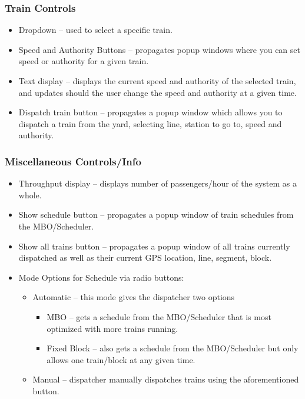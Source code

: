 	\subsubsection{Train Controls}
		\begin{itemize}
			\item Dropdown – used to select a specific train.
			\item Speed and Authority Buttons – propagates popup windows where you can set speed or authority for a given train.
			\item Text display – displays the current speed and authority of the selected train, and updates should the user change the speed and authority at a given time.
			\item Dispatch train button – propagates a popup window which allows you to dispatch a train from the yard, selecting line, station to go to, speed and authority.
		\end{itemize}

	\subsubsection{Miscellaneous Controls/Info}
		\begin{itemize}
			\item Throughput display – displays number of passengers/hour of the system as a whole.
			\item Show schedule button – propagates a popup window of train schedules from the MBO/Scheduler.
			\item Show all trains button – propagates a popup window of all trains currently dispatched as well as their current GPS location, line, segment, block.
			\item Mode Options for Schedule via radio buttons:
				\begin{itemize}
					\item Automatic – this mode gives the dispatcher two options
						\begin{itemize}
							\item MBO – gets a schedule from the MBO/Scheduler that is most optimized with more trains running.
							\item Fixed Block – also gets a schedule from the MBO/Scheduler but only allows one train/block at any given time.
						\end{itemize}
					\item Manual – dispatcher manually dispatches trains using the aforementioned button.
				\end{itemize}
		\end{itemize}


